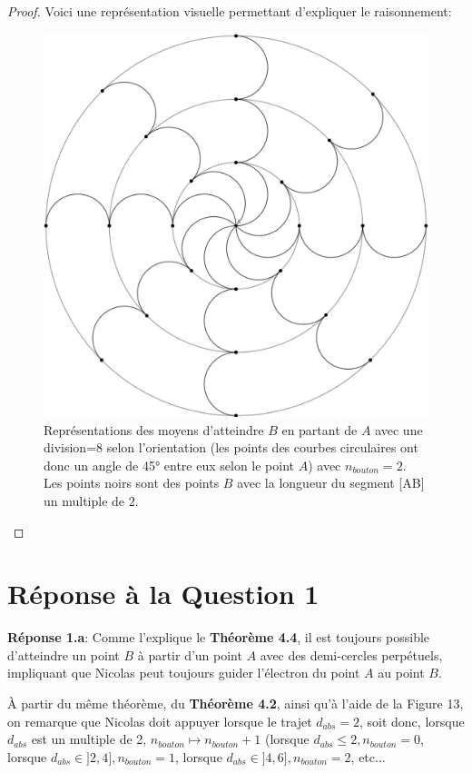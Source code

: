 \documentclass{amsart}
\theoremstyle{definition}
\theoremstyle{remark}
\numberwithin{equation}{section}
\begin{document}
\begin{proof}
  Voici une représentation visuelle permettant d'expliquer le raisonnement:
  \begin{figure}[H]
    \centering
    \includegraphics[scale=0.27]{visualization.png}
    \caption{Représentations des moyens d'atteindre $B$ en partant de $A$ avec une division=8 selon l'orientation (les points des courbes circulaires ont donc un angle de 45° entre eux selon le point $A$) avec $n_{bouton}=2$. 
    Les points noirs sont des points $B$ avec la longueur du segment [AB] un multiple de $2$.}
  \end{figure}
\end{proof}

\section{Réponse à la Question 1}

\textbf{Réponse 1.a}: Comme l'explique le \textbf{Théorème 4.4}, il est toujours possible d'atteindre un point $B$ à partir d'un point $A$ avec des demi-cercles perpétuels, impliquant que Nicolas peut toujours guider l'électron du point $A$ au point $B$. 

À partir du même théorème, du \textbf{Théorème 4.2}, ainsi qu'à l'aide de la Figure 13, on remarque que Nicolas doit appuyer lorsque le trajet $d_{abs}=2$, soit donc, lorsque $d_{abs}$ est un multiple de 2, $n_{bouton}\longmapsto n_{bouton}+1$ (lorsque $d_{abs}\leq2, n_{bouton}=0$, lorsque $d_{abs}\in]2,4], n_{bouton}=1$, lorsque $d_{abs}\in]4,6], n_{bouton}=2$, etc...
\end{document}
